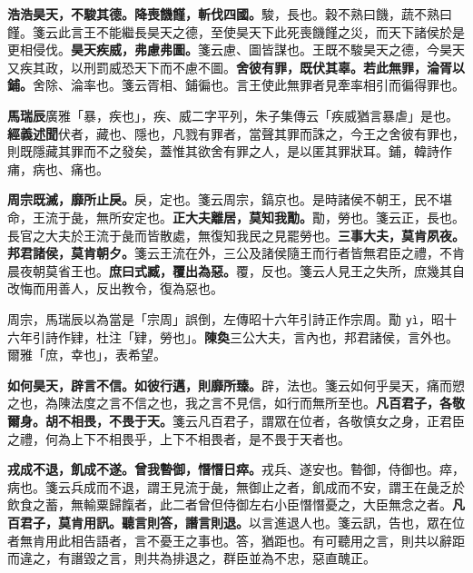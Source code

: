 \textbf{浩浩昊天，不駿其德。降喪饑饉，斬伐四國。}{\footnotesize 駿，長也。穀不熟曰饑，蔬不熟曰饉。箋云此言王不能繼長昊天之德，至使昊天下此死喪饑饉之災，而天下諸侯於是更相侵伐。}\textbf{昊天疾威，弗慮弗圖。}{\footnotesize 箋云慮、圖皆謀也。王既不駿昊天之德，今昊天又疾其政，以刑罰威恐天下而不慮不圖。}\textbf{舍彼有罪，既伏其辜。若此無罪，淪胥以鋪。}{\footnotesize 舍除、淪率也。箋云胥相、鋪徧也。言王使此無罪者見牽率相引而徧得罪也。}

\begin{quoting}\textbf{馬瑞辰}廣雅「暴，疾也」，疾、威二字平列，朱子集傳云「疾威猶言暴虐」是也。\textbf{經義述聞}伏者，藏也、隱也，凡戮有罪者，當聲其罪而誅之，今王之舍彼有罪也，則既隱藏其罪而不之發矣，蓋惟其欲舍有罪之人，是以匿其罪狀耳。鋪，韓詩作痡，病也、痛也。\end{quoting}

\textbf{周宗既滅，靡所止戾。}{\footnotesize 戾，定也。箋云周宗，鎬京也。是時諸侯不朝王，民不堪命，王流于彘，無所安定也。}\textbf{正大夫離居，莫知我勩。}{\footnotesize 勩，勞也。箋云正，長也。長官之大夫於王流于彘而皆散處，無復知我民之見罷勞也。}\textbf{三事大夫，莫肯夙夜。邦君諸侯，莫肯朝夕。}{\footnotesize 箋云王流在外，三公及諸侯隨王而行者皆無君臣之禮，不肯晨夜朝莫省王也。}\textbf{庶曰式臧，覆出為惡。}{\footnotesize 覆，反也。箋云人見王之失所，庶幾其自改悔而用善人，反出教令，復為惡也。}

\begin{quoting}周宗，馬瑞辰以為當是「宗周」誤倒，左傳昭十六年引詩正作宗周。勩 \texttt{yì}，昭十六年引詩作肄，杜注「肄，勞也」。\textbf{陳奐}三公大夫，言內也，邦君諸侯，言外也。爾雅「庶，幸也」，表希望。\end{quoting}

\textbf{如何昊天，辟言不信。如彼行邁，則靡所臻。}{\footnotesize 辟，法也。箋云如何乎昊天，痛而愬之也，為陳法度之言不信之也，我之言不見信，如行而無所至也。}\textbf{凡百君子，各敬爾身。胡不相畏，不畏于天。}{\footnotesize 箋云凡百君子，謂眾在位者，各敬慎女之身，正君臣之禮，何為上下不相畏乎，上下不相畏者，是不畏于天者也。}

\textbf{戎成不退，飢成不遂。曾我暬御，憯憯日瘁。}{\footnotesize 戎兵、遂安也。暬御，侍御也。瘁，病也。箋云兵成而不退，謂王見流于彘，無御止之者，飢成而不安，謂王在彘乏於飲食之蓄，無輸粟歸餼者，此二者曾但侍御左右小臣憯憯憂之，大臣無念之者。}\textbf{凡百君子，莫肯用訊。聽言則答，譖言則退。}{\footnotesize 以言進退人也。箋云訊，告也，眾在位者無肯用此相告語者，言不憂王之事也。答，猶距也。有可聽用之言，則共以辭距而違之，有譖毀之言，則共為排退之，群臣並為不忠，惡直醜正。}

